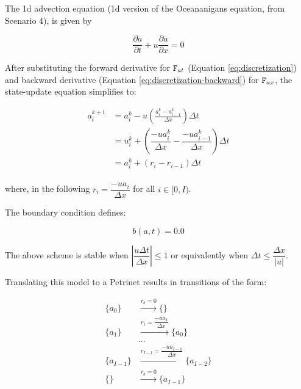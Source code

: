 \documentclass{article}
\begin{document}
The 1d advection equation (1d version of the Oceananigans equation, from
Scenario 4), is given by

\begin{equation}
    \dfrac{\partial a}{\partial t} + u\dfrac{\partial a}{\partial x} = 0
\end{equation}


After substituting the forward derivative for ${\tt F}_{at}$ (Equation
\ref{eq:discretization}) and backward derivative (Equation
\ref{eq:discretization-backward}) for ${\tt F}_{ax}$, the state-update equation
simplifies to:

\begin{equation}
    \begin{split}
        a_i^{k+1} &= a_i^k - u\left(\frac{a_i^k - a_{i-1}^k}{\Delta x}\right)\Delta t\\
        &= u_i^k + \left( \dfrac{-u a_i^k}{\Delta x}  -   \dfrac{-u a_{i-1}^k}{\Delta x} \right)\Delta t\\
        & = a_i^k +  (r_i - r_{i-1})\Delta t\\
    \end{split}
\end{equation}

\noindent where, in the following $r_i = \dfrac{-u a_i }{\Delta x}$ for all $i
    \in {[}0, I)$.

The boundary condition defines:

\begin{equation}
    b(a, t) = 0.0
\end{equation}

The above scheme is stable when $\left|\dfrac{u\Delta t}{\Delta x}\right| \leq
    1$ or equivalently when $\Delta t \leq \dfrac{\Delta x}{|u|}$.

Translating this model to a Petrinet results in transitions of the form:

\begin{equation}
    \begin{split}
        \{a_0\}&\xrightarrow{r_b = 0}\{\}\\
        \{a_1\}&\xrightarrow{r_1 = \dfrac{-u a_1}{\Delta x}}\{a_0\}\\
        &\ldots \\
        \{a_{I-1}\}&\xrightarrow{r_{I-1}= \dfrac{-u a_{I-1}}{\Delta x}}\{a_{I-2}\}\\
        \{\}&\xrightarrow{r_b=0}\{a_{I-1}\}
    \end{split}
\end{equation}
\end{document}

